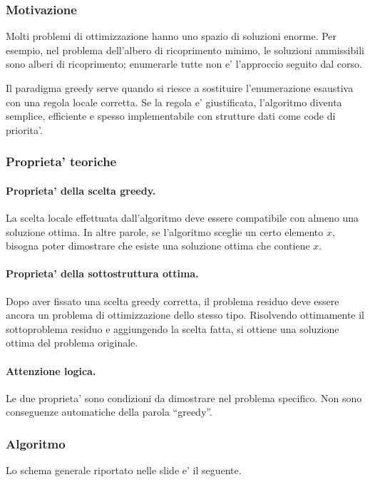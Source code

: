 \subsubsection{Motivazione}
Molti problemi di ottimizzazione hanno uno spazio di soluzioni enorme. Per esempio, nel problema dell'albero di ricoprimento minimo, le soluzioni ammissibili sono alberi di ricoprimento; enumerarle tutte non e' l'approccio seguito dal corso.

Il paradigma greedy serve quando si riesce a sostituire l'enumerazione esaustiva con una regola locale corretta. Se la regola e' giustificata, l'algoritmo diventa semplice, efficiente e spesso implementabile con strutture dati come code di priorita'.

\subsubsection{Proprieta' teoriche}
\paragraph{Proprieta' della scelta greedy.}
La scelta locale effettuata dall'algoritmo deve essere compatibile con almeno una soluzione ottima. In altre parole, se l'algoritmo sceglie un certo elemento $x$, bisogna poter dimostrare che esiste una soluzione ottima che contiene $x$.

\paragraph{Proprieta' della sottostruttura ottima.}
Dopo aver fissato una scelta greedy corretta, il problema residuo deve essere ancora un problema di ottimizzazione dello stesso tipo. Risolvendo ottimamente il sottoproblema residuo e aggiungendo la scelta fatta, si ottiene una soluzione ottima del problema originale.

\paragraph{Attenzione logica.}
Le due proprieta' sono condizioni da dimostrare nel problema specifico. Non sono conseguenze automatiche della parola ``greedy''.

\subsubsection{Algoritmo}
Lo schema generale riportato nelle slide e' il seguente.

